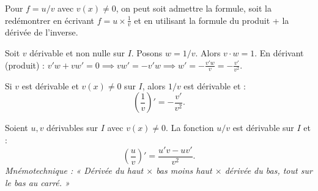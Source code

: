\documentclass[11pt]{article}
\begin{document}
Pour $f = u/v$ avec $v(x) \neq 0$, on peut soit admettre la formule, soit la redémontrer en écrivant $f = u \times \frac{1}{v}$ et en utilisant la formule du produit + la dérivée de l'inverse.

\begin{experience}
Soit $v$ dérivable et non nulle sur $I$. Posons $w = 1/v$. Alors $v \cdot w = 1$.
En dérivant (produit) : $v'w + vw' = 0 \implies vw' = -v'w \implies w' = -\frac{v'w}{v} = -\frac{v'}{v^2}$.
\end{experience}

\begin{propriete}
Si $v$ est dérivable et $v(x) \neq 0$ sur $I$, alors $1/v$ est dérivable et :
\[
\left(\frac{1}{v}\right)' = -\frac{v'}{v^2}.
\]
\end{propriete}

\begin{propriete}
Soient $u,v$ dérivables sur $I$ avec $v(x) \neq 0$. La fonction $u/v$ est dérivable sur $I$ et :
\[
\left(\frac{u}{v}\right)' = \frac{u'v - uv'}{v^2}.
\]
\textit{Mnémotechnique : « Dérivée du haut $\times$ bas moins haut $\times$ dérivée du bas, tout sur le bas au carré. »}
\end{propriete}
\end{document}

